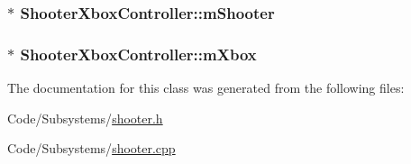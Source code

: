 \hypertarget{class_shooter_xbox_controller_a05f295c56c7c95ec80a475548d3d63d0}{
\subsubsection[{m\-Shooter}]{$\ast$ {\bf \-Shooter\-Xbox\-Controller\-::m\-Shooter}}}\label{class_shooter_xbox_controller_a05f295c56c7c95ec80a475548d3d63d0}
\hypertarget{class_shooter_xbox_controller_ac6a3e04c9fd8cbefa00817da2b40720d}{
\subsubsection[{m\-Xbox}]{$\ast$ {\bf \-Shooter\-Xbox\-Controller\-::m\-Xbox}}}\label{class_shooter_xbox_controller_ac6a3e04c9fd8cbefa00817da2b40720d}


\-The documentation for this class was generated from the following files\-:\begin{DoxyCompactItemize}
\item 
\-Code/\-Subsystems/\hyperlink{shooter_8h}{shooter.\-h}\item 
\-Code/\-Subsystems/\hyperlink{shooter_8cpp}{shooter.\-cpp}\end{DoxyCompactItemize}
